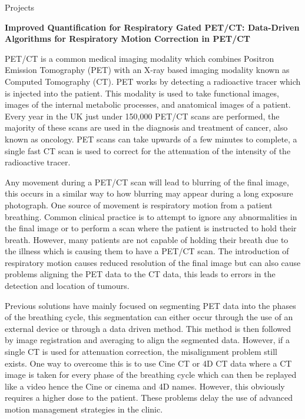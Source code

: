 \documentclass{cv}
\begin{document}
\begin{rSection}{Projects}

{\bf Improved Quantification for Respiratory Gated PET/CT: Data-Driven Algorithms for Respiratory Motion Correction in PET/CT} \hfill {\em} 

\item PET/CT is a common medical imaging modality which combines Positron Emission Tomography (PET) with an X-ray based imaging modality known as Computed Tomography (CT). PET works by detecting a radioactive tracer which is injected into the patient. This modality is used to take functional images, images of the internal metabolic processes, and anatomical images of a patient. Every year in the UK just under 150,000 PET/CT scans are performed, the majority of these scans are used in the diagnosis and treatment of cancer, also known as oncology. PET scans can take upwards of a few minutes to complete, a single fast CT scan is used to correct for the attenuation of the intensity of the radioactive tracer.

\item Any movement during a PET/CT scan will lead to blurring of the final image, this occurs in a similar way to how blurring may appear during a long exposure photograph. One source of movement is respiratory motion from a patient breathing. Common clinical practice is to attempt to ignore any abnormalities in the final image or to perform a scan where the patient is instructed to hold their breath. However, many patients are not capable of holding their breath due to the illness which is causing them to have a PET/CT scan. The introduction of respiratory motion causes reduced resolution of the final image but can also cause problems aligning the PET data to the CT data, this leads to errors in the detection and location of tumours.

\item Previous solutions have mainly focused on segmenting PET data into the phases of the breathing cycle, this segmentation can either occur through the use of an external device or through a data driven method. This method is then followed by image registration and averaging to align the segmented data. However, if a single CT is used for attenuation correction, the misalignment problem still exists. One way to overcome this is to use Cine CT or 4D CT data where a CT image is taken for every phase of the breathing cycle which can then be replayed like a video hence the Cine or cinema and 4D names. However, this obviously requires a higher dose to the patient. These problems delay the use of advanced motion management strategies in the clinic.


\end{rSection}
\end{document}

